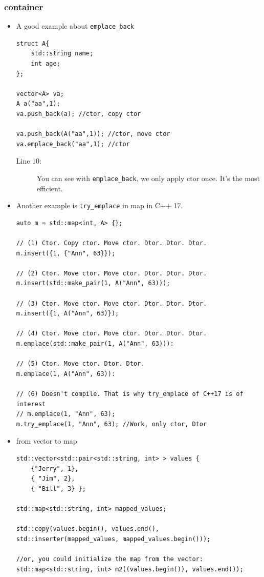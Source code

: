 \documentclass[a4paper,11pt,twoside]{book}
\begin{document}
\subsubsection{container}
\begin{itemize}
\item A good example about \texttt{emplace\_back}
\begin{lstlisting}
struct A{
	std::string name;
	int age;
};

vector<A> va;
A a("aa",1);
va.push_back(a); //ctor, copy ctor

va.push_back(A("aa",1)); //ctor, move ctor
va.emplace_back("aa",1); //ctor 
\end{lstlisting}
\begin{description}
\item[Line 10: ] You can see with \texttt{emplace\_back}, we only apply ctor once. It's the most efficient.
\end{description}

\item Another example is \texttt{try\_emplace} in map in C++ 17.

\begin{lstlisting}
auto m = std::map<int, A> {};
 
// (1) Ctor. Copy ctor. Move ctor. Dtor. Dtor. Dtor.
m.insert({1, {"Ann", 63}});
 
// (2) Ctor. Move ctor. Move ctor. Dtor. Dtor. Dtor.
m.insert(std::make_pair(1, A("Ann", 63)));
 
// (3) Ctor. Move ctor. Move ctor. Dtor. Dtor. Dtor.
m.insert({1, A("Ann", 63)});
 
// (4) Ctor. Move ctor. Move ctor. Dtor. Dtor. Dtor.
m.emplace(std::make_pair(1, A("Ann", 63))):
 
// (5) Ctor. Move ctor. Dtor. Dtor.
m.emplace(1, A("Ann", 63)):
 
// (6) Doesn't compile. That is why try_emplace of C++17 is of interest
// m.emplace(1, "Ann", 63);
m.try_emplace(1, "Ann", 63); //Work, only ctor, Dtor
\end{lstlisting}

\item from vector to map

\begin{lstlisting}
std::vector<std::pair<std::string, int> > values {   
	{"Jerry", 1},
	{ "Jim", 2},
	{ "Bill", 3} };

std::map<std::string, int> mapped_values;

std::copy(values.begin(), values.end(), 
std::inserter(mapped_values, mapped_values.begin()));

//or, you could initialize the map from the vector:
std::map<std::string, int> m2((values.begin()), values.end());
\end{lstlisting}
\end{itemize}
\end{document}
